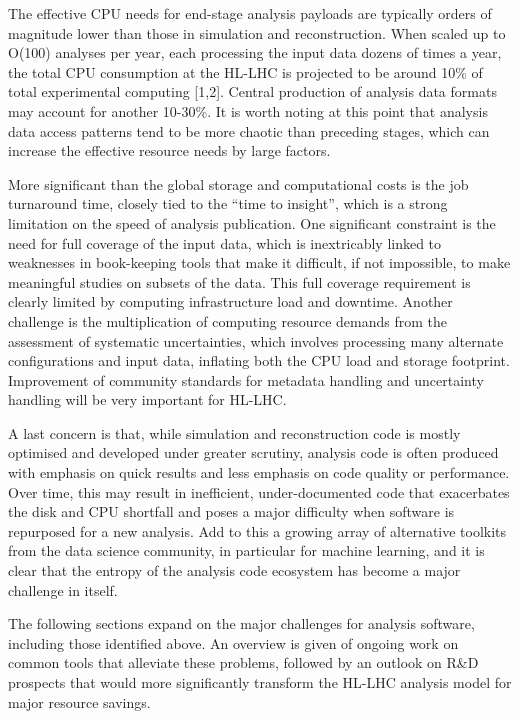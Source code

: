 \documentclass[11pt,a4paper]{article}
\begin{document}
The effective CPU needs for end-stage analysis payloads are typically
orders of magnitude lower than those in simulation and reconstruction.
When scaled up to O(100) analyses per year, each processing the input
data dozens of times a year, the total CPU consumption at the HL-LHC is
projected to be around 10\% of total experimental computing {[}1,2{]}.
Central production of analysis data formats may account for another
10-30\%. It is worth noting at this point that analysis data access
patterns tend to be more chaotic than preceding stages, which can
increase the effective resource needs by large factors.

More significant than the global storage and computational costs is the
job turnaround time, closely tied to the ``time to insight'', which is a
strong limitation on the speed of analysis publication. One significant
constraint is the need for full coverage of the input data, which is
inextricably linked to weaknesses in book-keeping tools that make it
difficult, if not impossible, to make meaningful studies on subsets of
the data. This full coverage requirement is clearly limited by computing
infrastructure load and downtime. Another challenge is the
multiplication of computing resource demands from the assessment of
systematic uncertainties, which involves processing many alternate
configurations and input data, inflating both the CPU load and storage
footprint. Improvement of community standards for metadata handling and
uncertainty handling will be very important for HL-LHC.

A last concern is that, while simulation and reconstruction code is
mostly optimised and developed under greater scrutiny, analysis code is
often produced with emphasis on quick results and less emphasis on code
quality or performance. Over time, this may result in inefficient,
under-documented code that exacerbates the disk and CPU shortfall and
poses a major difficulty when software is repurposed for a new analysis.
Add to this a growing array of alternative toolkits from the data
science community, in particular for machine learning, and it is clear
that the entropy of the analysis code ecosystem has become a major
challenge in itself.

The following sections expand on the major challenges for analysis
software, including those identified above. An overview is given of
ongoing work on common tools that alleviate these problems, followed by
an outlook on R\&D prospects that would more significantly transform the
HL-LHC analysis model for major resource savings.
\end{document}
